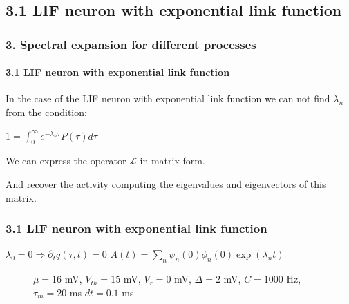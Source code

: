 \documentclass{beamer}
\begin{document}
\subsection{3.1 LIF neuron with exponential link function}
\begin{frame}
\frametitle{3. Spectral expansion for different processes}
\framesubtitle{3.1 LIF neuron with exponential link function}
	In the case of the LIF neuron with exponential link function we can not find $\lambda_n$ from the condition:

	\vspace{0.2cm}
	\hspace{2.5cm}$1=\int_0^{\infty}e^{-\lambda_n\tau}P(\tau)d\tau$

\pause
	\vspace{0.7cm}	
	We can express the operator $\mathcal{L}$ in matrix form.
	
	And recover the activity computing the eigenvalues and eigenvectors of this matrix.
	
	
\end{frame}

\begin{frame}
\frametitle{3.1 LIF neuron with exponential link function}

\hspace{0.7cm}$\lambda_0=0\Rightarrow \partial_t q(\tau,t)=0$ \hspace{0.8cm} $A(t)=\sum_n \psi_n(0)\phi_n(0)\exp(\lambda_nt) $
\begin{figure}
	\centering

\vspace{1cm}
\small{$\mu=16$ mV, $V_{th}=15$ mV, $V_r=0$ mV, $\Delta = 2$ mV, $C=1000$ Hz, $\tau_m=20$ ms $dt=0.1$ ms}
\end{figure}

\end{frame}
\end{document}

